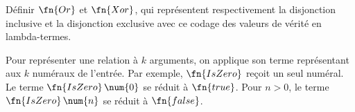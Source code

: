 \documentclass[../../../include/open-logic-section]{subfiles}
\begin{document}
\begin{prob}
Définir $\fn{Or}$ et $\fn{Xor}$,
qui représentent respectivement la
disjonction inclusive et la disjonction
exclusive avec ce codage des valeurs
de vérité en lambda-termes.
\end{prob}

Pour représenter une relation à $k$ arguments, on applique
son terme représentant aux $k$ numéraux de l'entrée.
Par exemple, $\fn{IsZero}$ reçoit un seul numéral.
Le terme $\fn{IsZero}\,\num{0}$ se réduit à $\fn{true}$.
Pour $n>0$, le terme $\fn{IsZero}\,\num{n}$ se réduit à
$\fn{false}$.
\end{document}
